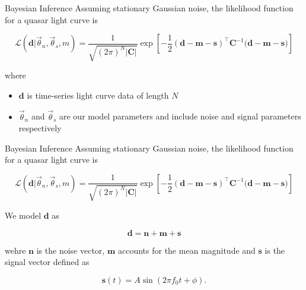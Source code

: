 \documentclass[aspectratio=169,11pt]{beamer}
\begin{document}
\begin{frame}{Bayesian Inference}
  Assuming stationary Gaussian noise, the likelihood function for a quasar light curve is

  \begin{equation*}
      \boxed{\displaystyle\mathcal{L}(\mathbf{d}| \Vec{\theta}_n, \Vec{\theta}_s, m) = \frac{1}{\sqrt{(2\pi)^N |\mathbf{C}|}} \exp \left[ -\frac{1}{2} (\mathbf{d - m - s})^\top \mathbf{C}^{-1} (\mathbf{d - m - s)} \right]}
  \end{equation*}

  where 
  \begin{itemize}
      \item $\mathbf{d}$ is time-series light curve data of length $N$
      \item $\Vec{\theta}_n$ and $\Vec{\theta}_s$ are our model parameters and include noise and signal parameters respectively
  \end{itemize}
  
\end{frame}

\begin{frame}{Bayesian Inference}
  Assuming stationary Gaussian noise, the likelihood function for a quasar light curve is

  \begin{equation*}
      \boxed{\displaystyle\mathcal{L}(\mathbf{d}| \Vec{\theta}_n, \Vec{\theta}_s, m) = \frac{1}{\sqrt{(2\pi)^N |\mathbf{C}|}} \exp \left[ -\frac{1}{2} (\mathbf{d - m - s})^\top \mathbf{C}^{-1} (\mathbf{d - m - s)} \right]}
  \end{equation*}

  We model $\mathbf{d}$ as

  \begin{equation*}
      \mathbf{d = n + m + s}
  \end{equation*}

  wehre $\mathbf{n}$ is the noise vector, $\mathbf{m}$ accounts for the mean magnitude and $\mathbf{s}$ is the signal vector defined as 

  \begin{equation*}
      \mathbf{s}(t) = A\sin (2\pi f_0 t + \phi).
  \end{equation*}
  
\end{frame}
\end{document}
